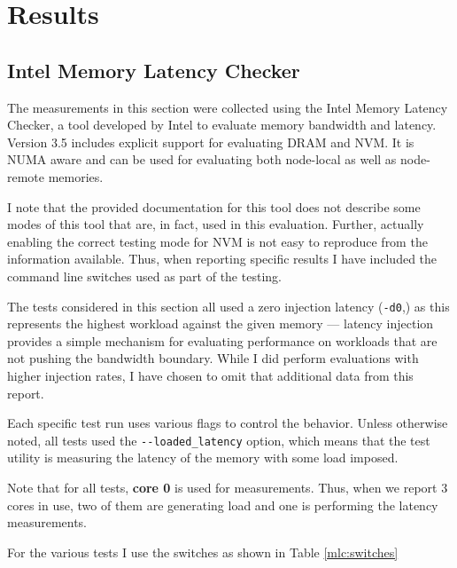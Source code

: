 
\chapter{Results}
\label{ch:Results}

\section{Intel Memory Latency Checker}

The measurements in this section were collected using the Intel Memory Latency Checker, a tool
developed by Intel to evaluate memory bandwidth and latency.  Version 3.5 includes explicit
support for evaluating DRAM and NVM.  It is NUMA aware and can be used for evaluating both
node-local as well as node-remote memories.~\cite{IntelMLC35}

I note that the provided documentation for this tool does not describe some modes of
this tool that are, in fact, used in this evaluation.  Further, actually enabling the
correct testing mode for NVM is not easy to reproduce from the information available.
Thus, when reporting specific results I have included the command line switches used
as part of the testing. 

The tests considered in this section all used a zero injection latency (\texttt{-d0},)
as this represents the highest workload against the given memory --- latency injection
provides a simple mechanism for evaluating performance on workloads that are not
pushing the bandwidth boundary.  While I did perform evaluations with higher
injection rates, I have chosen to omit that additional data from this report.

Each specific test run uses various flags to control the behavior.  Unless
otherwise noted, all tests used the \verb+--loaded_latency+ option, which
means that the test utility is measuring the latency of the memory with
some load imposed.

Note that for all tests, \textbf{core 0} is used for measurements.  Thus, when
we report 3 cores in use, two of them are generating load and one is performing
the latency measurements.

For the various tests I use the switches as shown in Table \ref{mlc:switches}

